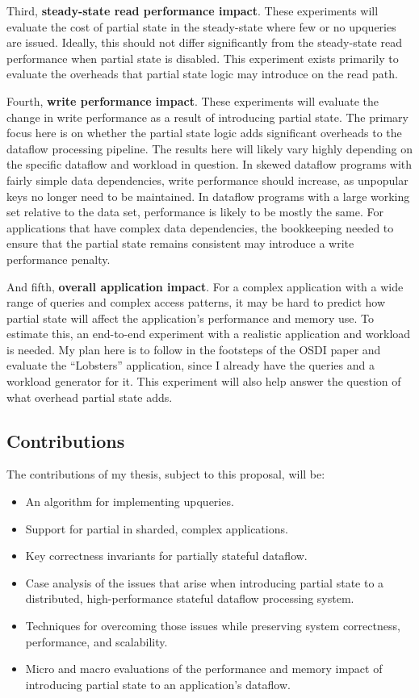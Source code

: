 \documentclass[12pt,letterpaper,twoside]{article}
\begin{document}
Third, \textbf{steady-state read performance impact}. These experiments will
evaluate the cost of partial state in the steady-state where few or no
upqueries are issued. Ideally, this should not differ significantly from
the steady-state read performance when partial state is disabled. This
experiment exists primarily to evaluate the overheads that partial state
logic may introduce on the read path.

Fourth, \textbf{write performance impact}. These experiments will evaluate
the change in write performance as a result of introducing partial
state. The primary focus here is on whether the partial state logic adds
significant overheads to the dataflow processing pipeline. The results
here will likely vary highly depending on the specific dataflow and
workload in question. In skewed dataflow programs with fairly simple
data dependencies, write performance should increase, as unpopular keys
no longer need to be maintained. In dataflow programs with a large
working set relative to the data set, performance is likely to be mostly
the same. For applications that have complex data dependencies, the
bookkeeping needed to ensure that the partial state remains consistent
may introduce a write performance penalty.

And fifth, \textbf{overall application impact}. For a complex application
with a wide range of queries and complex access patterns, it may be hard
to predict how partial state will affect the application's performance
and memory use. To estimate this, an end-to-end experiment with a
realistic application and workload is needed. My plan here is to
follow in the footsteps of the OSDI paper and evaluate the ``Lobsters''
application, since I already have the queries and a workload generator
for it. This experiment will also help answer the question of what
overhead partial state adds.

\subsection{Contributions}

The contributions of my thesis, subject to this proposal, will be:

\begin{itemize}
 \item An algorithm for implementing upqueries.
 \item Support for partial in sharded, complex applications.
 \item Key correctness invariants for partially stateful dataflow.
 \item Case analysis of the issues that arise when introducing partial state to
	 a distributed, high-performance stateful dataflow processing system.
 \item Techniques for overcoming those issues while preserving system
	 correctness, performance, and scalability.
 \item Micro and macro evaluations of the performance and memory impact of
	 introducing partial state to an application's dataflow.
\end{itemize}
\end{document}
